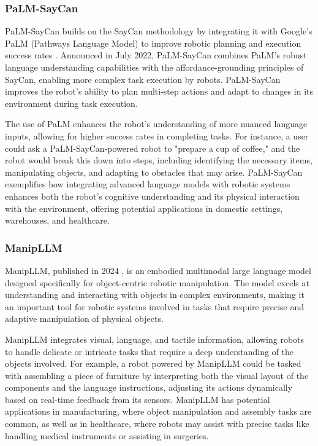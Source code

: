 \subsubsection{PaLM-SayCan}

PaLM-SayCan builds on the SayCan methodology by integrating it with Google's PaLM (Pathways Language Model) to improve robotic planning and execution success rates \cite{chowdhery2022palm}. 
Announced in July 2022, PaLM-SayCan combines PaLM's robust language understanding capabilities with the affordance-grounding principles of SayCan, enabling more complex task execution by robots. 
PaLM-SayCan improves the robot's ability to plan multi-step actions and adapt to changes in its environment during task execution.

The use of PaLM enhances the robot's understanding of more nuanced language inputs, allowing for higher success rates in completing tasks. 
For instance, a user could ask a PaLM-SayCan-powered robot to "prepare a cup of coffee," and the robot would break this down into steps, including identifying the necessary items, manipulating objects, and adapting to obstacles that may arise. 
PaLM-SayCan exemplifies how integrating advanced language models with robotic systems enhances both the robot's cognitive understanding and its physical interaction with the environment, offering potential applications in domestic settings, warehouses, and healthcare.

\subsubsection{ManipLLM}

ManipLLM, published in 2024 \cite{huang2024manip}, is an embodied multimodal large language model designed specifically for object-centric robotic manipulation. 
The model excels at understanding and interacting with objects in complex environments, making it an important tool for robotic systems involved in tasks that require precise and adaptive manipulation of physical objects.

ManipLLM integrates visual, language, and tactile information, allowing robots to handle delicate or intricate tasks that require a deep understanding of the objects involved. 
For example, a robot powered by ManipLLM could be tasked with assembling a piece of furniture by interpreting both the visual layout of the components and the language instructions, adjusting its actions dynamically based on real-time feedback from its sensors. 
ManipLLM has potential applications in manufacturing, where object manipulation and assembly tasks are common, as well as in healthcare, where robots may assist with precise tasks like handling medical instruments or assisting in surgeries.

